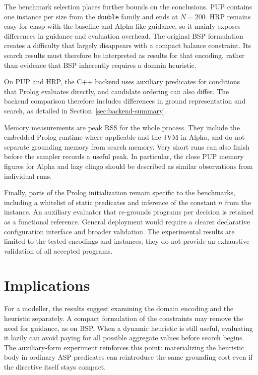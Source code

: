 The benchmark selection places further bounds on the conclusions. PUP contains one instance per size from the \texttt{double} family and ends at $N=200$. HRP remains easy for clasp with the baseline and Alpha-like guidance, so it mainly exposes differences in guidance and evaluation overhead. The original BSP formulation creates a difficulty that largely disappears with a compact balance constraint. Its search results must therefore be interpreted as results for that encoding, rather than evidence that BSP inherently requires a domain heuristic.

On PUP and HRP, the C++ backend uses auxiliary predicates for conditions that Prolog evaluates directly, and candidate ordering can also differ. The backend comparison therefore includes differences in ground representation and search, as detailed in Section~\ref{sec:backend-summary}.

Memory measurements are peak RSS for the whole process. They include the embedded Prolog runtime where applicable and the JVM in Alpha, and do not separate grounding memory from search memory. Very short runs can also finish before the sampler records a useful peak. In particular, the close PUP memory figures for Alpha and lazy clingo should be described as similar observations from individual runs.

Finally, parts of the Prolog initialization remain specific to the benchmarks, including a whitelist of static predicates and inference of the constant $n$ from the instance. An auxiliary evaluator that re-grounds programs per decision is retained as a functional reference. General deployment would require a clearer declarative configuration interface and broader validation. The experimental results are limited to the tested encodings and instances; they do not provide an exhaustive validation of all accepted programs.

\section{Implications}

For a modeller, the results suggest examining the domain encoding and the heuristic separately. A compact formulation of the constraints may remove the need for guidance, as on BSP. When a dynamic heuristic is still useful, evaluating it lazily can avoid paying for all possible aggregate values before search begins. The auxiliary-form experiment reinforces this point: materializing the heuristic body in ordinary ASP predicates can reintroduce the same grounding cost even if the directive itself stays compact.

